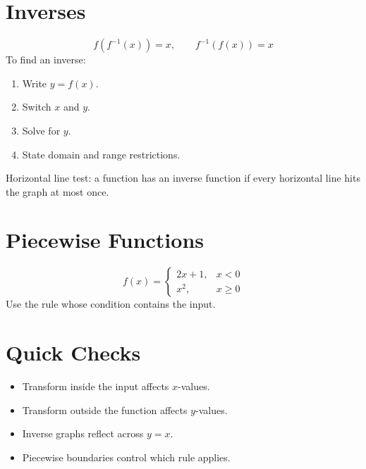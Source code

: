 \documentclass[11pt]{article}
\begin{document}
\section*{Inverses}
\[
f(f^{-1}(x))=x,\qquad f^{-1}(f(x))=x
\]
To find an inverse:
\begin{enumerate}
  \item Write $y=f(x)$.
  \item Switch $x$ and $y$.
  \item Solve for $y$.
  \item State domain and range restrictions.
\end{enumerate}
Horizontal line test: a function has an inverse function if every horizontal line hits the graph at most once.

\section*{Piecewise Functions}
\[
f(x)=
\begin{cases}
2x+1, & x<0\\
x^2, & x\ge0
\end{cases}
\]
Use the rule whose condition contains the input.

\section*{Quick Checks}
\begin{itemize}
  \item Transform inside the input affects $x$-values.
  \item Transform outside the function affects $y$-values.
  \item Inverse graphs reflect across $y=x$.
  \item Piecewise boundaries control which rule applies.
\end{itemize}
\end{document}
